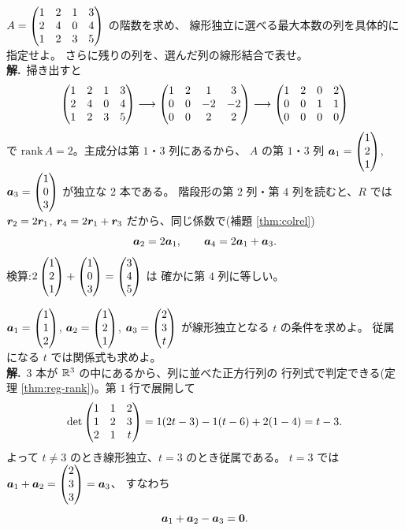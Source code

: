 \begin{rei}[例題・基本(階数の計算と独立な列の特定)]\label{rei:rank-pivot}
$A = \begin{pmatrix}1 & 2 & 1 & 3 \\ 2 & 4 & 0 & 4 \\ 1 & 2 & 3 & 5\end{pmatrix}$ の階数を求め、
線形独立に選べる最大本数の列を具体的に指定せよ。
さらに残りの列を、選んだ列の線形結合で表せ。\\
\textbf{解.}\ 掃き出すと
\[
\begin{pmatrix}1 & 2 & 1 & 3 \\ 2 & 4 & 0 & 4 \\ 1 & 2 & 3 & 5\end{pmatrix}
\longrightarrow
\begin{pmatrix}1 & 2 & 1 & 3 \\ 0 & 0 & -2 & -2 \\ 0 & 0 & 2 & 2\end{pmatrix}
\longrightarrow
\begin{pmatrix}1 & 2 & 0 & 2 \\ 0 & 0 & 1 & 1 \\ 0 & 0 & 0 & 0\end{pmatrix}
\]
で $\mathrm{rank}\,A = 2$。主成分は第 $1$・$3$ 列にあるから、
$A$ の第 $1$・$3$ 列 $\bm{a}_1 = \begin{pmatrix}1 \\ 2 \\ 1\end{pmatrix}$,
$\bm{a}_3 = \begin{pmatrix}1 \\ 0 \\ 3\end{pmatrix}$ が独立な $2$ 本である。
階段形の第 $2$ 列・第 $4$ 列を読むと、$R$ では
$\bm{r}_2 = 2\bm{r}_1$, $\bm{r}_4 = 2\bm{r}_1 + \bm{r}_3$
だから、同じ係数で(補題 \ref{thm:colrel})
\[
\bm{a}_2 = 2\bm{a}_1, \qquad \bm{a}_4 = 2\bm{a}_1 + \bm{a}_3.
\]
検算:$2\begin{pmatrix}1 \\ 2 \\ 1\end{pmatrix} + \begin{pmatrix}1 \\ 0 \\ 3\end{pmatrix} = \begin{pmatrix}3 \\ 4 \\ 5\end{pmatrix}$ は
確かに第 $4$ 列に等しい。
\end{rei}

\begin{rei}[例題・標準(パラメータを含む判定)]\label{rei:rank-param}
$\bm{a}_1 = \begin{pmatrix}1 \\ 1 \\ 2\end{pmatrix}$, $\bm{a}_2 = \begin{pmatrix}1 \\ 2 \\ 1\end{pmatrix}$,
$\bm{a}_3 = \begin{pmatrix}2 \\ 3 \\ t\end{pmatrix}$ が線形独立となる $t$ の条件を求めよ。
従属になる $t$ では関係式も求めよ。\\
\textbf{解.}\ $3$ 本が $\mathbb{R}^3$ の中にあるから、列に並べた正方行列の
行列式で判定できる(定理 \ref{thm:reg-rank})。第 $1$ 行で展開して
\[
\det \begin{pmatrix}1 & 1 & 2 \\ 1 & 2 & 3 \\ 2 & 1 & t\end{pmatrix}
= 1(2t - 3) - 1(t - 6) + 2(1 - 4) = t - 3.
\]
よって $t \neq 3$ のとき線形独立、$t = 3$ のとき従属である。
$t = 3$ では $\bm{a}_1 + \bm{a}_2 = \begin{pmatrix}2 \\ 3 \\ 3\end{pmatrix} = \bm{a}_3$、
すなわち
\[
\bm{a}_1 + \bm{a}_2 - \bm{a}_3 = \bm{0}.
\]
\end{rei}

